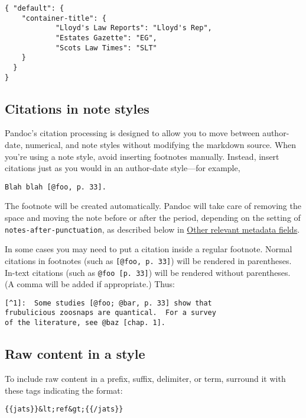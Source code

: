 \documentclass[
]{article}
\begin{document}
\begin{verbatim}
{ "default": {
    "container-title": {
            "Lloyd's Law Reports": "Lloyd's Rep",
            "Estates Gazette": "EG",
            "Scots Law Times": "SLT"
    }
  }
}
\end{verbatim}

\subsection{Citations in note styles}\label{citations-in-note-styles}

Pandoc's citation processing is designed to allow you to move between
author-date, numerical, and note styles without modifying the markdown
source. When you're using a note style, avoid inserting footnotes
manually. Instead, insert citations just as you would in an author-date
style---for example,

\begin{verbatim}
Blah blah [@foo, p. 33].
\end{verbatim}

The footnote will be created automatically. Pandoc will take care of
removing the space and moving the note before or after the period,
depending on the setting of \texttt{notes-after-punctuation}, as
described below in \hyperref[other-relevant-metadata-fields]{Other
relevant metadata fields}.

In some cases you may need to put a citation inside a regular footnote.
Normal citations in footnotes (such as \texttt{{[}@foo,\ p.\ 33{]}})
will be rendered in parentheses. In-text citations (such as
\texttt{@foo\ {[}p.\ 33{]}}) will be rendered without parentheses. (A
comma will be added if appropriate.) Thus:

\begin{verbatim}
[^1]:  Some studies [@foo; @bar, p. 33] show that
frubulicious zoosnaps are quantical.  For a survey
of the literature, see @baz [chap. 1].
\end{verbatim}

\subsection{Raw content in a style}\label{raw-content-in-a-style}

To include raw content in a prefix, suffix, delimiter, or term, surround
it with these tags indicating the format:

\begin{verbatim}
{{jats}}&lt;ref&gt;{{/jats}}
\end{verbatim}
\end{document}
